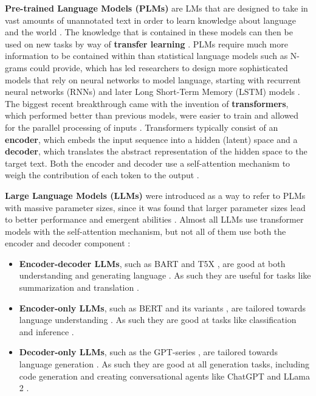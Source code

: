 \documentclass[a4paper]{article}
\begin{document}
\textbf{Pre-trained Language Models (PLMs)} are LMs that are designed to take in vast amounts of unannotated text in order to learn knowledge about language and the world \cite{jurafsky2025}. The knowledge that is contained in these models can then be used on new tasks by way of \textbf{transfer learning} \cite{wang2023plm}. PLMs require much more information to be contained within than statistical language models such as N-grams could provide, which has led researchers to design more sophisticated models that rely on neural networks to model language, starting with recurrent neural networks (RNNs) and later Long Short-Term Memory (LSTM) models \cite{mikolov2012rnn,hochreiter1997lstm}. The biggest recent breakthrough came with the invention of \textbf{transformers}, which performed better than previous models, were easier to train and allowed for the parallel processing of inputs \cite{Vaswani2017transformer}. Transformers typically consist of an \textbf{encoder}, which embeds the input sequence into a hidden (latent) space and a \textbf{decoder}, which translates the abstract representation of the hidden space to the target text. Both the encoder and decoder use a self-attention mechanism to weigh the contribution of each token to the output \cite{Vaswani2017transformer,bahdanau2016attention}.

\textbf{Large Language Models (LLMs)} were introduced as a way to refer to PLMs with massive parameter sizes, since it was found that larger parameter sizes lead to better performance and emergent abilities \cite{kaplan2020scaling,wei2022emergent}. Almost all LLMs use transformer models with the self-attention mechanism, but not all of them use both the encoder and decoder component \cite{hou2024}:
\begin{itemize}
    \item \textbf{Encoder-decoder LLMs}, such as BART \cite{lewis2019bart} and T5X \cite{roberts2022t5x}, are good at both understanding and generating language \cite{hou2024}. As such they are useful for tasks like summarization and translation \cite{cho2014encoderdecoder, Asadi2020encoderdecoder}.
    \item \textbf{Encoder-only LLMs}, such as BERT and its variants \cite{devlin2019bert,liu2019roberta,sanh2019distilbert,lan2020albert}, are tailored towards language understanding \cite{hou2024}. As such they are good at tasks like classification and inference \cite{koroteev2021encoder}. 
    \item \textbf{Decoder-only LLMs}, such as the GPT-series \cite{radford2018gpt,brown2020gpt3,openai2024gpt4}, are tailored towards language generation \cite{hou2024}. As such they are good at all generation tasks, including code generation \cite{poldrack2023} and creating conversational agents like ChatGPT \cite{OpenAI2023chatgpt} and LLama 2 \cite{touvron2023llama2}.
\end{itemize}
\end{document}
